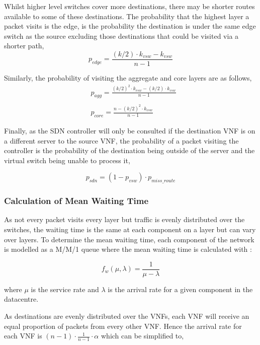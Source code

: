 Whilst higher level switches cover more destinations, there may be shorter routes available to some of these destinations. The probability that the highest layer a packet visits is the edge, is the probability the destination is under the same edge switch as the source excluding those destinations that could be visited via a shorter path,
\begin{equation}
\label{eq:p_edge}
p_{edge} = \frac{(k/2) \cdot k_{vsw} - k_{vsw}}{n - 1}
\end{equation}

Similarly, the probability of visiting the aggregate and core layers are as follows,
\begin{align}
\label{eq:p_agg_core}
&p_{agg} = \frac{(k/2)^2 \cdot k_{vsw} - (k/2) \cdot k_{vsw}}{n - 1} \\ \nonumber \\
&p_{core} = \frac{n - (k/2)^2 \cdot k_{vsw}}{n - 1}
\end{align}

Finally, as the SDN controller will only be consulted if the destination VNF is on a different server to the source VNF, the probability of a packet visiting the controller is the probability of the destination being outside of the server and the virtual switch being unable to process it,

\begin{equation}
\label{eq:p_sdn}
p_{sdn} = (1 - p_{vsw}) \cdot p_{miss\_route}
\end{equation}

\subsubsection{Calculation of Mean Waiting Time}
As not every packet visits every layer but traffic is evenly distributed over the switches, the waiting time is the same at each component on a layer but can vary over layers. To determine the mean waiting time, each component of the network is modelled as a M/M/1 queue where the mean waiting time is calculated with \cite{Kleinrock75}:

\begin{equation}
\label{eq:MM1_time_in_network}
f_w(\mu, \lambda) = \frac{1}{\mu - \lambda}
\end{equation}

\noindent where $\mu$ is the service rate and $\lambda$ is the arrival rate for a given component in the datacentre.

As destinations are evenly distributed over the VNFs, each VNF will receive an equal proportion of packets from every other VNF. Hence the arrival rate for each VNF is $(n - 1) \cdot \frac{1}{n - 1} \cdot \alpha$ which can be simplified to, 

